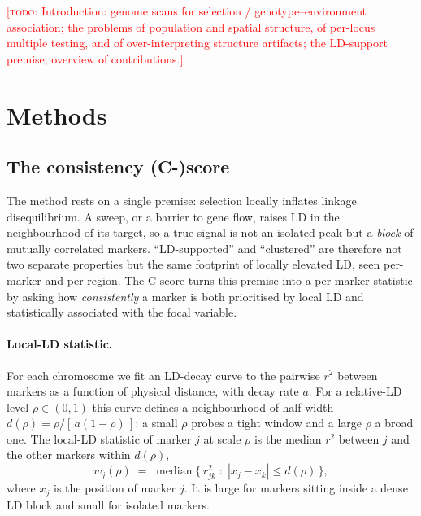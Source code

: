 \documentclass[11pt]{article}
\newcommand{\todo}[1]{\textcolor{red}{[\textsc{todo}: #1]}}
\begin{document}
\todo{Introduction: genome scans for selection / genotype--environment
association; the problems of population and spatial structure, of per-locus
multiple testing, and of over-interpreting structure artifacts; the LD-support
premise; overview of contributions.}

\section{Methods}

\subsection{The consistency (C-)score}
\label{sec:cscore}

The method rests on a single premise: selection locally inflates linkage
disequilibrium. A sweep, or a barrier to gene flow, raises LD in the
neighbourhood of its target, so a true signal is not an isolated peak but a
\emph{block} of mutually correlated markers. ``LD-supported'' and ``clustered''
are therefore not two separate properties but the same footprint of locally
elevated LD, seen per-marker and per-region. The C-score turns this premise into
a per-marker statistic by asking how \emph{consistently} a marker is both
prioritised by local LD and statistically associated with the focal variable.

\paragraph{Local-LD statistic.}
For each chromosome we fit an LD-decay curve to the pairwise $r^2$ between markers
as a function of physical distance, with decay rate $a$. For a relative-LD level
$\rho \in (0,1)$ this curve defines a neighbourhood of half-width
$d(\rho) = \rho / [\,a(1-\rho)\,]$: a small $\rho$ probes a tight window and a
large $\rho$ a broad one. The local-LD statistic of marker $j$ at scale $\rho$ is
the median $r^2$ between $j$ and the other markers within $d(\rho)$,
\begin{equation}
  w_j(\rho) \;=\; \operatorname{median}\bigl\{\, r^2_{jk} \;:\; |x_j - x_k| \le d(\rho) \,\bigr\},
\end{equation}
where $x_j$ is the position of marker $j$. It is large for markers sitting inside
a dense LD block and small for isolated markers.
\end{document}
